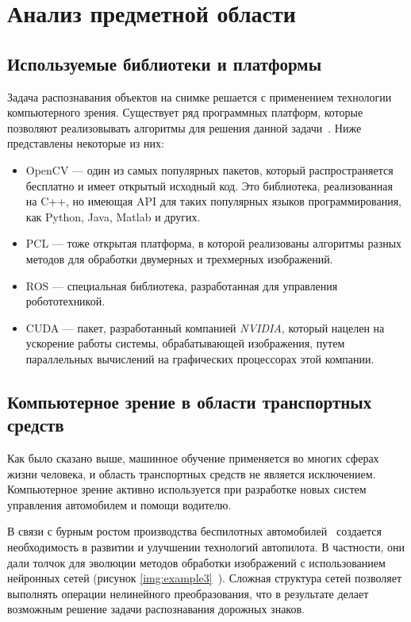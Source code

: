 \chapter{Анализ предметной области}

\section{Используемые библиотеки и платформы}
Задача распознавания объектов на снимке решается с применением технологии компьютерного зрения. Существует ряд программных платформ, которые позволяют реализовывать алгоритмы для решения данной задачи~\cite{comp_vision}. Ниже представлены некоторые из них:
\begin{itemize}[label=---]
    \item OpenCV --- один из самых популярных пакетов, который распространяется бесплатно и имеет открытый исходный код. Это библиотека, реализованная на C++, но имеющая API для таких популярных языков программирования, как Python, Java, Matlab и других.
    \item PCL --- тоже открытая платформа, в которой реализованы алгоритмы разных методов для обработки двумерных и трехмерных изображений.
    \item ROS --- специальная библиотека, разработанная для управления робототехникой.
    \item CUDA --- пакет, разработанный компанией \textit{NVIDIA}, который нацелен на ускорение работы системы, обрабатывающей изображения, путем параллельных вычислений на графических процессорах этой компании.
\end{itemize}

\section{Компьютерное зрение в области транспортных средств}

Как было сказано выше, машинное обучение применяется во многих сферах жизни человека, и область транспортных средств не является исключением. Компьютерное зрение активно используется при разработке новых систем управления автомобилем и помощи водителю. 

В связи с бурным ростом производства беспилотных автомобилей~\cite{tadviser} создается необходимость в развитии и улучшении технологий автопилота. В частности, они дали толчок для эволюции методов обработки изображений с использованием нейронных сетей (рисунок \ref{img:example3}~\cite{neuro_sys}). Сложная структура сетей позволяет выполнять операции нелинейного преобразования, что в результате делает возможным решение задачи распознавания дорожных знаков.




